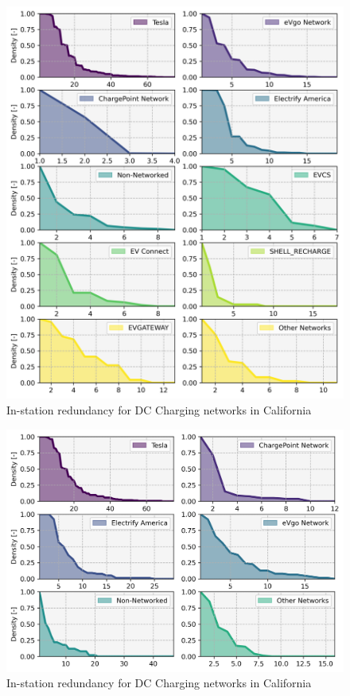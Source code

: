 \documentclass[11pt]{article}
\begin{document}
\begin{multicols}{2}
\begin{figure}[H]
	\centering
	\includegraphics[width = \linewidth]{figs/California_RIS_SF_All.png}
	\caption{In-station redundancy for DC Charging networks in California}
	\label{fig:ris_top_networks}
\end{figure}

\begin{figure}[H]
	\centering
	\includegraphics[width = \linewidth]{figs/California_RIS_SF_Corridor.png}
	\caption{In-station redundancy for DC Charging networks in California}
	\label{fig:ris_top_networks_corridor}
\end{figure}



\end{multicols}
\end{document}
